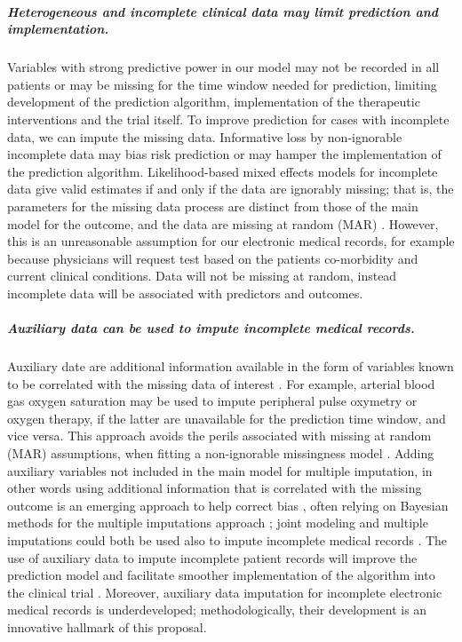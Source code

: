 \documentclass[11pt,notitlepage]{article}
\begin{document}
\subparagraph*{Heterogeneous and incomplete clinical data may limit prediction and implementation.}
Variables with strong predictive power in our model may not be recorded in all patients or may be missing for the time window needed for prediction, limiting development of the prediction algorithm, implementation of the therapeutic interventions and the trial itself. To improve prediction for cases with incomplete data, we can impute the missing data. Informative loss by non-ignorable incomplete data may bias risk prediction or may hamper the implementation of the prediction algorithm. Likelihood-based mixed effects models for incomplete data give valid estimates if and only if the data are ignorably missing; that is, the parameters for the missing data process are distinct from those of the main model for the outcome, and the data are missing at random (MAR) \cite{Rubin_1976}. However, this is an unreasonable assumption for our electronic medical records, for example because physicians will request test based on the patients co-morbidity and current clinical conditions. Data will not be missing at random, instead incomplete data will be associated with predictors and outcomes.

\subparagraph*{Auxiliary data can be used to impute incomplete medical records.}
Auxiliary date are additional information available in the form of variables known to be correlated with the missing data of interest \cite{Daniels24571539}. For example, arterial blood gas oxygen saturation may be used to impute peripheral pulse oxymetry or oxygen therapy, if the latter are unavailable for the prediction time window, and vice versa. This approach avoids the perils associated with missing at random (MAR) assumptions, when fitting a non-ignorable missingness model \cite{Wang_20029935}. Adding auxiliary variables not included in the main model for multiple imputation, in other words using additional information that is correlated with the missing outcome is an emerging approach to help correct bias \cite{Meng_1994, Collins_11778676, Rubin_1996}, often relying on Bayesian methods for the multiple imputations approach \cite{Daniels_2008, Schafer_1997}; joint modeling and multiple imputations could both be used also to impute incomplete medical records \cite{Fitzmaurice_2008}. The use of auxiliary data to impute incomplete patient records will improve the prediction model and facilitate smoother implementation of the algorithm into the clinical trial \cite{Hall_25389642}. Moreover, auxiliary data imputation for incomplete electronic medical records is underdeveloped; methodologically, their development is an innovative hallmark of this proposal.
\end{document}
